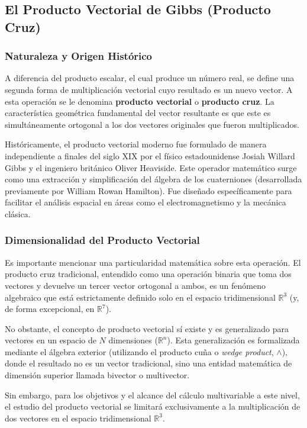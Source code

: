 \subsection{El Producto Vectorial de Gibbs (Producto Cruz)}

\subsubsection{Naturaleza y Origen Histórico}

A diferencia del producto escalar, el cual produce un número real, se define una segunda forma de multiplicación vectorial cuyo resultado es un nuevo vector. A esta operación se le denomina \textbf{producto vectorial} o \textbf{producto cruz}. La característica geométrica fundamental del vector resultante es que este es simultáneamente ortogonal a los dos vectores originales que fueron multiplicados.

Históricamente, el producto vectorial moderno fue formulado de manera independiente a finales del siglo XIX por el físico estadounidense Josiah Willard Gibbs y el ingeniero británico Oliver Heaviside. Este operador matemático surge como una extracción y simplificación del álgebra de los cuaterniones (desarrollada previamente por William Rowan Hamilton). Fue diseñado específicamente para facilitar el análisis espacial en áreas como el electromagnetismo y la mecánica clásica.

\subsubsection{Dimensionalidad del Producto Vectorial}

Es importante mencionar una particularidad matemática sobre esta operación. El producto cruz tradicional, entendido como una operación binaria que toma dos vectores y devuelve un tercer vector ortogonal a ambos, es un fenómeno algebraico que está estrictamente definido solo en el espacio tridimensional $\mathbb{R}^3$ (y, de forma excepcional, en $\mathbb{R}^7$). 

No obstante, el concepto de producto vectorial sí existe y es generalizado para vectores en un espacio de $N$ dimensiones ($\mathbb{R}^n$). Esta generalización es formalizada mediante el álgebra exterior (utilizando el producto cuña o \textit{wedge product}, $\wedge$), donde el resultado no es un vector tradicional, sino una entidad matemática de dimensión superior llamada bivector o multivector. 

Sin embargo, para los objetivos y el alcance del cálculo multivariable a este nivel, el estudio del producto vectorial se limitará exclusivamente a la multiplicación de dos vectores en el espacio tridimensional $\mathbb{R}^3$.

